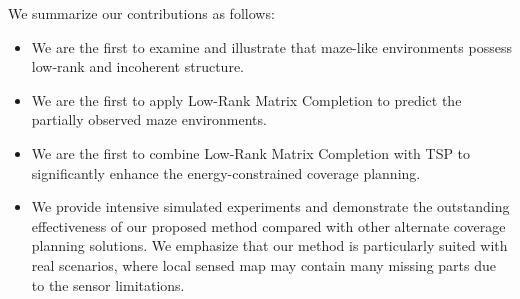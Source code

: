 We summarize our contributions as follows:
\begin{itemize}
    \item 
    We are the first to examine and illustrate that maze-like environments possess low-rank and incoherent structure.
    \item
    We are the first to apply Low-Rank Matrix Completion to predict the partially observed maze environments.
    \item
    We are the first to combine Low-Rank Matrix Completion with TSP to significantly enhance the energy-constrained coverage planning.
    \item
    We provide intensive simulated experiments and demonstrate the outstanding effectiveness of our proposed method compared with other alternate coverage planning solutions. We emphasize that our method is particularly suited with real scenarios, where local sensed map may contain many missing parts due to the sensor limitations.
\end{itemize}
